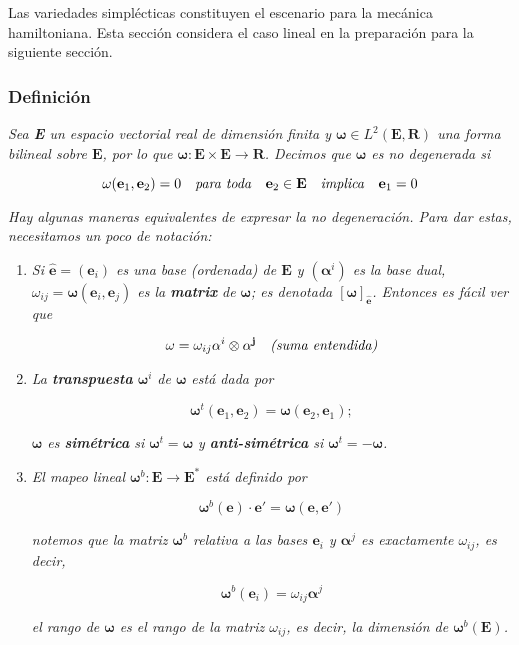 \documentclass[a4paper,10pt]{article}
\numberwithin{equation}{section}
\begin{document}
Las variedades simplécticas constituyen el escenario para la mecánica 
hamiltoniana. Esta sección considera el caso lineal en la preparación 
para la siguiente sección.

\subsubsection{Definición}

\emph{Sea \textbf{E} un espacio vectorial real de dimensión finita y 
$\mathbf{\omega} \in L^2(\mathbf{E},\mathbf{R})$ una forma bilineal
sobre $\mathbf{E}$, por lo que $\mathbf{\omega}: \mathbf{E}\times \mathbf{E} 
\rightarrow \mathbf{R}$. Decimos que $\mathbf{\omega}$ es no degenerada 
si}

$$
\mathbf{\omega}(\mathbf{e}_1, \mathbf{e}_2) = 0 \quad \text{\emph{para toda}}
\quad \mathbf{e}_2 \in \mathbf{E} \quad \text{\emph{implica}} \quad 
\mathbf{e}_1 = 0
$$

\emph{Hay algunas maneras equivalentes de expresar la no degeneración. Para 
dar estas, necesitamos un poco de notación:}

\begin{enumerate}[label=({\alph*})]
 \item \emph{Si $\hat{\mathbf{e}} = (\mathbf{e}_i)$ es una base 
 (ordenada) de $\mathbf{E}$ y $(\mathbf{\alpha}^i)$ es la base dual, 
 $\omega_{ij} = \mathbf{\omega}(\mathbf{e}_i,\mathbf{e}_j)$ es la 
 \textbf{matrix} de $\mathbf{\omega}$; es denotada $[\mathbf{\omega}]_{\hat{\mathbf{e}}}$. 
 Entonces es fácil ver que }
 
 $$
 \mathbf{\omega} = \omega_{ij} \mathbf{\alpha}^i \otimes \mathbf{\alpha^j} \quad \text{\emph{(suma entendida)}}
 $$
 
 \item \emph{La \textbf{transpuesta} $\mathbf{\omega}^i$ de $\mathbf{\omega}$ está dada 
 por }
 
 $$
 \mathbf{\omega}^t(\mathbf{e}_1,\mathbf{e}_2) = \mathbf{\omega}(\mathbf{e}_2,\mathbf{e}_1);
 $$
 
 \emph{$\mathbf{\omega}$ es \textbf{simétrica} si $\mathbf{\omega}^t = \mathbf{\omega}$ 
 y \textbf{anti-simétrica} si $\mathbf{\omega}^t = - \mathbf{\omega}$.}
 
 \item \emph{El mapeo lineal $\mathbf{\omega}^b: \mathbf{E} \rightarrow \mathbf{E}^*$ 
 está definido por}
 
 $$
 \mathbf{\omega}^b(\mathbf{e})\cdot\mathbf{e}' = \mathbf{\omega}(\mathbf{e},\mathbf{e}')
 $$
 
 \emph{notemos que la matriz $\mathbf{\omega}^b$ relativa a las bases $\mathbf{e}_i$ y 
 $\mathbf{\alpha}^j$ es exactamente $\omega_{ij}$, es decir,} 
 
 $$
 \mathbf{\omega}^b(\mathbf{e}_i) = \omega_{ij}\mathbf{\alpha}^j
 $$
 
 \emph{el rango de $\mathbf{\omega}$ es el rango de la matriz $\omega_{ij}$, es decir, 
 la dimensión de $\mathbf{\omega}^b(\mathbf{E})$.}
\end{enumerate}
\end{document}

